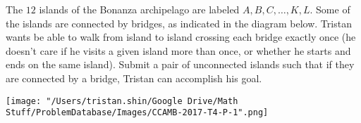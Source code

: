 The $12$ islands of the Bonanza archipelago are labeled $A,B,C,\dots,K,L$. Some of the islands are connected by bridges, as indicated in the diagram below. Tristan wants be able to walk from island to island crossing each bridge exactly once (he doesn't care if he visits a given island more than once, or whether he starts and ends on the same island). Submit a pair of unconnected islands such that if they are connected by a bridge, Tristan can accomplish his goal.
\begin{center}
	\texttt{[image: "/Users/tristan.shin/Google Drive/Math Stuff/ProblemDatabase/Images/CCAMB-2017-T4-P-1".png]}
\end{center}